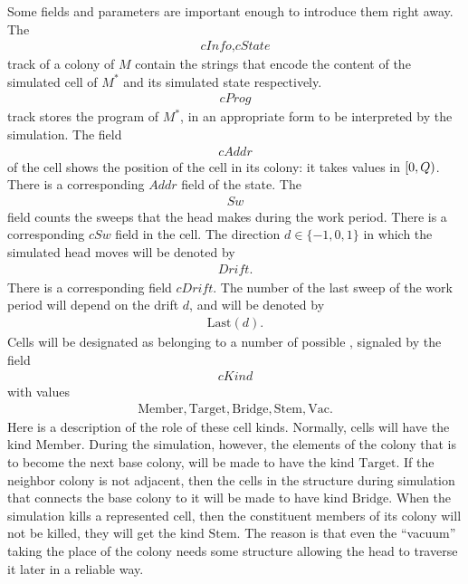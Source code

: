 \documentclass[12pt]{memoir}
\newcommand{\fld}[1]{\ensuremath{\textit{#1}}}
\newcommand{\Addr}{\fld{Addr}}
\newcommand{\cAddr}{\fld{cAddr}}
\newcommand{\Drift}{\fld{Drift}}
\newcommand{\cDrift}{\fld{cDrift}}
\newcommand{\cInfo}{\fld{cInfo}}
\newcommand{\cKind}{\fld{cKind}}
\newcommand{\cProg}{\fld{cProg}}
\newcommand{\cState}{\fld{cState}}
\newcommand{\Sweep}{\fld{Sw}}
\newcommand{\cSweep}{\fld{cSw}}
\newcommand{\Bridge}{\mathrm{Bridge}}
\newcommand{\Last}{\mathrm{Last}}
\newcommand{\Member}{\mathrm{Member}}
\newcommand{\Target}{\mathrm{Target}}
\newcommand{\Stem}{\mathrm{Stem}}
\newcommand{\Vacant}{\mathrm{Vac}}
\begin{document}
Some fields and parameters are important enough to introduce them right away.
The 
\begin{align*}
   \cInfo,\cState
 \end{align*}
track of a colony of \( M \)
contain the strings that encode the content of the simulated cell of \( M^{*} \) and
its simulated state respectively.
\begin{align*}
 \cProg
 \end{align*}
track stores the program of \( M^{*} \), in an appropriate form 
to be interpreted by the simulation.
The field 
 \begin{align*}
  \cAddr
 \end{align*}
of the cell shows the position of the cell in its colony:
it takes values in \( [0,Q) \).
There is a corresponding \( \Addr \) field of the state.
The
 \begin{align*}
 \Sweep
 \end{align*}
field counts the sweeps that the head makes during the work period.
There is a corresponding \( \cSweep \) field in the cell.
The direction \( d\in\{-1,0,1\} \) in which the 
simulated head moves will be denoted by
 \begin{align*}
   \Drift.
 \end{align*}
There is a corresponding field \( \cDrift \).
The number of the last sweep of the work period will depend on the drift \( d \), 
and will be denoted by 
\begin{align}\label{eq:Last}
   \Last(d).
 \end{align}
Cells will be designated as belonging to a number of possible , signaled by the
field 
\begin{align*}
     \cKind
 \end{align*}
with values
       \begin{align*}
          \Member, \Target, \Bridge, \Stem, \Vacant.
       \end{align*}
Here is a description of the role of these cell kinds.
Normally, cells will have the kind \( \Member \).
During the simulation, however, the elements of the colony that is to become
the next base colony, will be made to have the kind \( \Target \).
If the neighbor colony 
is not adjacent, then the cells in the structure during simulation
that connects the base colony to it will be made to have kind \( \Bridge \).
When the simulation kills a represented cell, then the constituent members
of its colony will not be killed, they will get the kind \( \Stem \).
The reason is that even the ``vacuum'' taking the place of the colony needs some
structure allowing the head to traverse it later in a reliable way.
\end{document}
